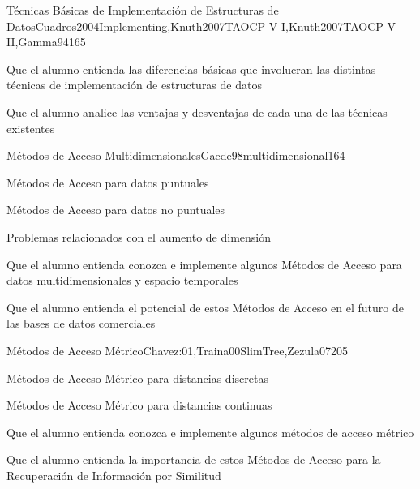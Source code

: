 \begin{syllabus}
\begin{unit}{Técnicas Básicas de Implementación de Estructuras de Datos}{Cuadros2004Implementing,Knuth2007TAOCP-V-I,Knuth2007TAOCP-V-II,Gamma94}{16}{5}
   \begin{learningoutcomes}
         \item Que el alumno entienda las diferencias básicas que involucran las distintas técnicas de implementación de estructuras de datos
         \item Que el alumno analice las ventajas y desventajas de cada una de las técnicas existentes
   \end{learningoutcomes}
\end{unit}

\begin{unit}{Métodos de Acceso Multidimensionales}{Gaede98multidimensional}{16}{4}
   \begin{topics}
         \item Métodos de Acceso para datos puntuales
         \item Métodos de Acceso para datos no puntuales
         \item Problemas relacionados con el aumento de dimensión
   \end{topics}

   \begin{learningoutcomes}
         \item Que el alumno entienda conozca e implemente algunos Métodos de Acceso para datos multidimensionales y espacio temporales
         \item Que el alumno entienda el potencial de estos Métodos de Acceso en el futuro de las bases de datos comerciales
   \end{learningoutcomes}
\end{unit}

\begin{unit}{Métodos de Acceso Métrico}{Chavez:01,Traina00SlimTree,Zezula07}{20}{5}
   \begin{topics}
         \item Métodos de Acceso Métrico para distancias discretas
         \item Métodos de Acceso Métrico para distancias continuas
   \end{topics}

   \begin{learningoutcomes}
         \item Que el alumno entienda conozca e implemente algunos métodos de acceso métrico
         \item Que el alumno entienda la importancia de estos Métodos de Acceso para la Recuperación de Información por Similitud
   \end{learningoutcomes}
\end{unit}


\end{syllabus}
